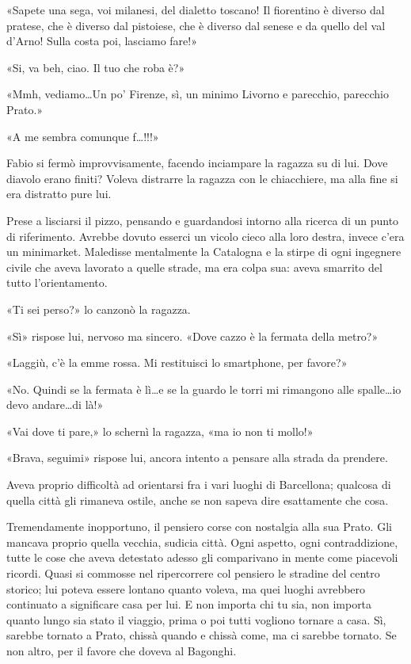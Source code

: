 «Sapete una sega, voi milanesi, del dialetto toscano! Il fiorentino è diverso dal pratese, che è diverso dal pistoiese, che è diverso dal senese e da quello del val d'Arno! Sulla costa poi, lasciamo fare!»

«Si, va beh, ciao. Il tuo che roba è?»

«Mmh, vediamo\ldots Un po' Firenze, sì, un minimo Livorno e parecchio, parecchio Prato.»

«A me sembra comunque f\ldots !!!»

Fabio si fermò improvvisamente, facendo inciampare la ragazza su di lui. Dove diavolo erano finiti? Voleva distrarre la ragazza con le chiacchiere, ma alla fine si era distratto pure lui.

Prese a lisciarsi il pizzo, pensando e guardandosi intorno alla ricerca di un punto di riferimento. Avrebbe dovuto esserci un vicolo cieco alla loro destra, invece c'era un minimarket. Maledisse mentalmente la Catalogna e la stirpe di ogni ingegnere civile che aveva lavorato a quelle strade, ma era colpa sua: aveva smarrito del tutto l'orientamento.

«Ti sei perso?» lo canzonò la ragazza.

«Sì» rispose lui, nervoso ma sincero. «Dove cazzo è la fermata della metro?»

«Laggiù, c'è la emme rossa. Mi restituisci lo smartphone, per favore?»

«No. Quindi se la fermata è lì\ldots e se la guardo le torri mi rimangono alle spalle\ldots io devo andare\ldots di là!»

«Vai dove ti pare,» lo schernì la ragazza, «ma io non ti mollo!»

«Brava, seguimi» rispose lui, ancora intento a pensare alla strada da prendere.

Aveva proprio difficoltà ad orientarsi fra i vari luoghi di Barcellona; qualcosa di quella città gli rimaneva ostile, anche se non sapeva dire esattamente che cosa.

Tremendamente inopportuno, il pensiero corse con nostalgia alla sua Prato. Gli mancava proprio quella vecchia, sudicia città. Ogni aspetto, ogni contraddizione, tutte le cose che aveva detestato adesso gli comparivano in mente come piacevoli ricordi. Quasi si commosse nel ripercorrere col pensiero le stradine del centro storico; lui poteva essere lontano quanto voleva, ma quei luoghi avrebbero continuato a significare casa per lui. E non importa chi tu sia, non importa quanto lungo sia stato il viaggio, prima o poi tutti vogliono tornare a casa. Sì, sarebbe tornato a Prato, chissà quando e chissà come, ma ci sarebbe tornato. Se non altro, per il favore che doveva al Bagonghi.

